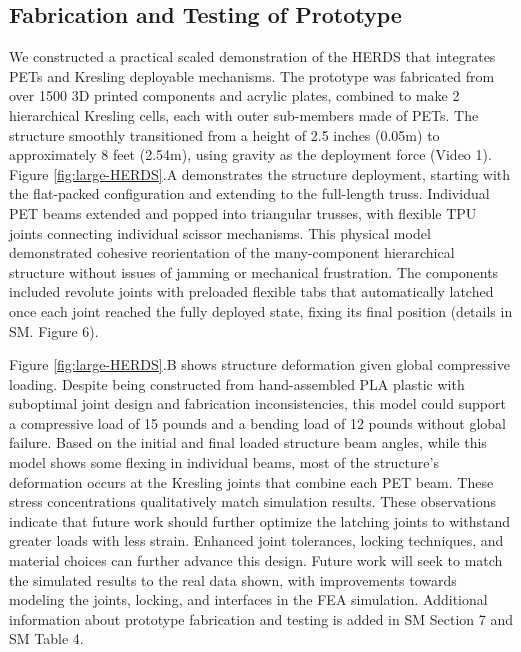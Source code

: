 \subsection{Fabrication and Testing of Prototype}
We constructed a practical scaled demonstration of the HERDS that integrates PETs and Kresling {deployable} mechanisms. The prototype was fabricated from over 1500 3D printed components and acrylic plates, combined to make 2 hierarchical Kresling cells, each with outer sub-members made of PETs. The structure smoothly transitioned from a height of 2.5 inches (0.05m) to approximately 8 feet (2.54m), using gravity as the deployment force (Video 1). Figure \ref{fig:large-HERDS}.A demonstrates the structure deployment, starting with the flat-packed configuration and extending to the full-length truss. Individual PET beams extended and popped into triangular trusses, with flexible TPU joints connecting individual scissor mechanisms. This physical model demonstrated cohesive reorientation of the many-component hierarchical structure without issues of jamming or mechanical frustration. The components included revolute joints with preloaded flexible tabs that automatically latched once each joint reached the fully deployed state, fixing its final position (details in SM. Figure 6).

Figure \ref{fig:large-HERDS}.B shows structure deformation given global compressive loading. Despite being constructed from hand-assembled PLA plastic with suboptimal joint design and fabrication inconsistencies, this model could support a compressive load of 15 pounds and a bending load of 12 pounds without global failure. Based on the initial and final loaded structure beam angles, while this model shows some flexing in individual beams, most of the structure's deformation occurs at the Kresling joints that combine each PET beam. These stress concentrations qualitatively match simulation results. These observations indicate that future work should further optimize the latching joints to withstand greater loads with less strain.  Enhanced joint tolerances, locking techniques, and material choices can further advance this design. Future work will seek to match the simulated results to the real data shown, with improvements towards modeling the joints, locking, and interfaces in the FEA simulation. Additional information about prototype fabrication and testing is added in SM Section 7 and SM Table 4. 

